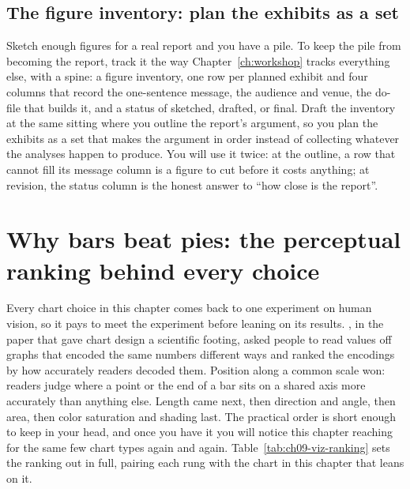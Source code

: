 \documentclass[
    a4paper,
    fontsize=10pt,
    twoside=true,
    numbers=noenddot,
]{kaobook}
\begin{document}
\subsection{The figure inventory: plan the exhibits as a set}\label{ch09-sc-inventory}
Sketch enough figures for a real report and you have a pile. To keep the pile from becoming the report, track it the way Chapter~\ref{ch:workshop} tracks everything else, with a spine: a figure inventory, one row per planned exhibit and four columns that record the one-sentence message, the audience and venue, the do-file that builds it, and a status of sketched, drafted, or final. Draft the inventory at the same sitting where you outline the report's argument, so you plan the exhibits as a set that makes the argument in order instead of collecting whatever the analyses happen to produce. You will use it twice: at the outline, a row that cannot fill its message column is a figure to cut before it costs anything; at revision, the status column is the honest answer to \enquote{how close is the report}.

\section{Why bars beat pies: the perceptual ranking behind every choice}\label{sec:perception}
Every chart choice in this chapter comes back to one experiment on human vision, so it pays to meet the experiment before leaning on its results. \textcite{cleveland1984graphical}, in the paper that gave chart design a scientific footing, asked people to read values off graphs that encoded the same numbers different ways and ranked the encodings by how accurately readers decoded them. Position along a common scale won: readers judge where a point or the end of a bar sits on a shared axis more accurately than anything else. Length came next, then direction and angle, then area, then color saturation and shading last. The practical order is short enough to keep in your head, and once you have it you will notice this chapter reaching for the same few chart types again and again. Table~\ref{tab:ch09-viz-ranking} sets the ranking out in full, pairing each rung with the chart in this chapter that leans on it.
\end{document}
